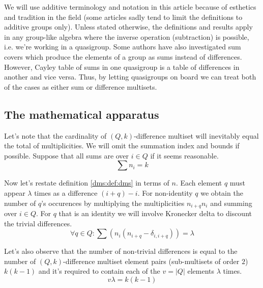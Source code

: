 \begin{remark}
    \label{dms:remark:abelian}
    We will use additive terminology and notation in this article because of esthetics and tradition in the field (some articles sadly tend to limit the definitions to additive groups only). Unless stated otherwise, the definitions and results apply in any group-like algebra where the inverse operation (subtraction) is possible, i.e. we're working in a quasigroup.
    Some authors \cite{haanpaa2004minimum} have also investigated sum covers which produce the elements of a group as sums instead of differences. However, Cayley table of sums in one quasigroup is a table of differences in another and vice versa. Thus, by letting quasigroups on board we can treat both of the cases as either sum or difference multisets.
\end{remark}

\subsection{The mathematical apparatus}
    Let's note that the cardinality of $(Q,k)$-difference multiset will inevitably equal the total of multiplicities. We will omit the summation index and bounds if possible. Suppose that all sums are over $i \in Q$ if it seems reasonable.
    \begin{equation}
        \label{apparatus:eq:ni}
        \sum {n_i} = k
    \end{equation}
    
    Now let's restate definition \ref{dms:def:dms} in terms of $n$. Each element $q$ must appear $\lambda$ times as a difference $(i+q)-i$. For non-identity $q$ we obtain the number of $q$'s occurences by multiplying the multiplicities $n_{i+q} n_i$ and summing over $i \in Q$. For $q$ that is an identity we will involve Kronecker delta to discount the trivial differences.
    \begin{equation}
        \label{apparatus:eq:system}
        \forall q \in Q \colon \sum (n_i(n_{i+q}-\delta_{i,i+q})) = \lambda
    \end{equation}
    
    Let's also observe that the number of non-trivial differences is equal to the number of $(Q,k)$-difference multiset element pairs (sub-multisets of order $2$) $k(k-1)$ and it's required to contain each of the $v=|Q|$ elements $\lambda$ times.
    \begin{equation}
        \label{apparatus:eq:parameters}
        v\lambda = k(k-1)
    \end{equation}
    
